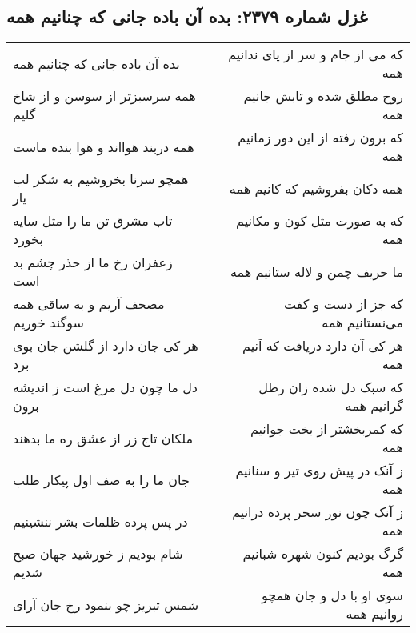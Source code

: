 \begin{center}
\section*{غزل شماره ۲۳۷۹: بده آن باده جانی که چنانیم همه}
\label{sec:2379}
\begin{longtable}{l p{0.5cm} r}
بده آن باده جانی که چنانیم همه
&&
که می از جام و سر از پای ندانیم همه
\\
همه سرسبزتر از سوسن و از شاخ گلیم
&&
روح مطلق شده و تابش جانیم همه
\\
همه دربند هوااند و هوا بنده ماست
&&
که برون رفته از این دور زمانیم همه
\\
همچو سرنا بخروشیم به شکر لب یار
&&
همه دکان بفروشیم که کانیم همه
\\
تاب مشرق تن ما را مثل سایه بخورد
&&
که به صورت مثل کون و مکانیم همه
\\
زعفران رخ ما از حذر چشم بد است
&&
ما حریف چمن و لاله ستانیم همه
\\
مصحف آریم و به ساقی همه سوگند خوریم
&&
که جز از دست و کفت می‌نستانیم همه
\\
هر کی جان دارد از گلشن جان بوی برد
&&
هر کی آن دارد دریافت که آنیم همه
\\
دل ما چون دل مرغ است ز اندیشه برون
&&
که سبک دل شده زان رطل گرانیم همه
\\
ملکان تاج زر از عشق ره ما بدهند
&&
که کمربخشتر از بخت جوانیم همه
\\
جان ما را به صف اول پیکار طلب
&&
ز آنک در پیش روی تیر و سنانیم همه
\\
در پس پرده ظلمات بشر ننشینیم
&&
ز آنک چون نور سحر پرده درانیم همه
\\
شام بودیم ز خورشید جهان صبح شدیم
&&
گرگ بودیم کنون شهره شبانیم همه
\\
شمس تبریز چو بنمود رخ جان آرای
&&
سوی او با دل و جان همچو روانیم همه
\\
\end{longtable}
\end{center}
